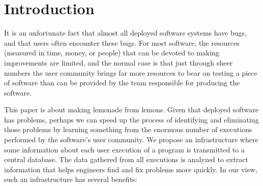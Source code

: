 \section{Introduction}

It is an unfortunate fact that almost all deployed software systems
have bugs, and that users often encounter these bugs.  For most
software, the resources (measured in time, money, or people) that can
be devoted to making improvements are limited, and the normal case is
that just through sheer numbers the user community brings far more
resources to bear on testing a piece of software than can be provided
by the team responsible for producing the software.

This paper is about making lemonade from lemons.  Given that deployed
software has problems, perhaps we can speed up the process of
identifying and eliminating those problems by learning something from
the enormous number of executions performed by the software's user
community.  We propose an infrastructure where some information about
each user execution of a program is transmitted to a central database.
The data gathered from all executions is analyzed to extract
information that helps engineers find and fix problems more quickly.
In our view, such an infrastructure has several benefits:
